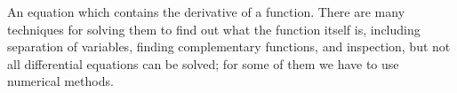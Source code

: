 An equation which contains the derivative of a function.
There are many techniques for solving them to find out what
the function itself is, including separation of variables,
finding complementary functions, and inspection, but not all
differential equations can be solved; for some of them we have
to use numerical methods.